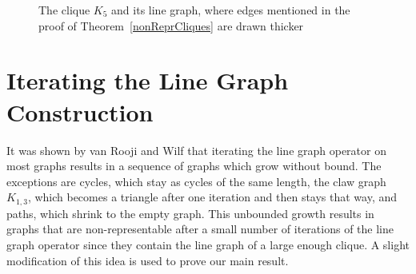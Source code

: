 \documentclass[12pt]{article}
\begin{document}
\begin{figure}[h]
\begin{center}
 \caption{The clique $K_5$ and its line graph, where edges mentioned in the proof of Theorem~\ref{nonReprCliques}
 are drawn thicker}
 \label{fig:clique}
\end{center}
\end{figure}

\section{Iterating the Line Graph Construction}\label{iteratingLineGraph}

It was shown by van Rooji and Wilf \cite{WvR} that iterating the line graph operator on most graphs results in a sequence of graphs which grow without bound. The exceptions are cycles, which stay as cycles of the same length, the claw graph $K_{1,3}$, which becomes a triangle after one iteration and then stays that way, and paths, which shrink to the empty graph. This unbounded growth results in graphs that are non-representable after a small number of iterations of the line graph operator since they contain the line graph of a large enough clique. A slight modification of this idea is used to prove our main result. 
\end{document}
